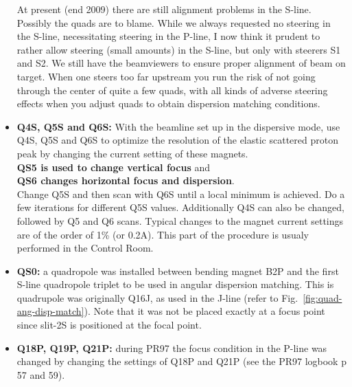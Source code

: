 \documentclass[11pt]{report}
\begin{document}
\begin{itemize}
      At present (end 2009) there are still alignment problems in the S-line. Possibly the quads are
      to blame. While we always requested no steering in the S-line, necessitating steering in the 
      P-line, I now think it prudent to rather allow steering (small amounts) in the S-line, but only 
      with steerers S1 and S2. We still have the  beamviewers to ensure proper alignment of beam on target.
      When one steers too far upstream you run the risk of not going through the center of quite a few quads,
      with all kinds of adverse steering effects when you adjust quads to obtain dispersion matching conditions.
\item {\bf Q4S, Q5S  and Q6S:} With the beamline set up in the dispersive mode, use Q4S, Q5S  and Q6S 
      to optimize the resolution of the elastic scattered proton peak 
      by changing the current setting of these magnets.\\
      {\bf QS5 is used to change vertical focus} and \\
      {\bf QS6 changes horizontal focus and dispersion}. \\
	Change Q5S and then scan with  Q6S until a local minimum is achieved. 
      Do a few iterations for different Q5S values.
      Additionally Q4S can also be changed, followed by Q5 and Q6 scans.
      Typical changes to the magnet current settings are of the order of 1\% (or 0.2A).
      This part of the procedure is usualy performed in the Control Room.
\item {\bf QS0:} a quadropole was installed between bending magnet B2P and the 
      first S-line quadropole triplet to be used in angular dispersion matching. 
      This is quadrupole was originally Q16J, as used in the J-line (refer to Fig.~\ref{fig:quad-ang-disp-match}).
      Note that it was not be placed exactly at a focus point since slit-2S is positioned at the focal point.
\item {\bf Q18P, Q19P, Q21P:} during PR97 the focus condition in the P-line was changed 
      by changing the settings of Q18P and Q21P 
      (see the PR97 logbook p 57 and 59). 

\end{itemize}
\end{document}
